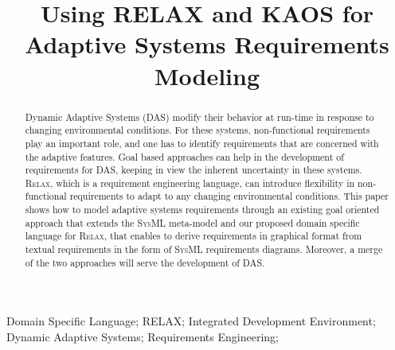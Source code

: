 \documentclass[10pt, conference, compsocconf]{IEEEtran}
\def\myrelax{\textsc{Relax}}                  %
\def\sysml{\textsc{SysML}}
\begin{document}
%
\title{Using RELAX and KAOS for Adaptive Systems Requirements Modeling}



\author{
\and
{}
}


\maketitle

\begin{abstract}
Dynamic Adaptive Systems (DAS) modify their behavior at run-time in response to 
changing environmental conditions. For these systems, non-functional requirements play an 
important role, and one has to identify requirements that are concerned with the adaptive 
features.  Goal based approaches can help in the development of requirements for DAS, keeping in view the inherent uncertainty in these systems. \myrelax{}, which is a requirement engineering language, can introduce flexibility in 
non-functional requirements to adapt to any changing environmental conditions. 
This paper shows how to model adaptive systems requirements through an existing goal 
oriented approach that extends the \sysml{} meta-model and our proposed domain 
specific language for \myrelax{}, that enables to derive requirements in graphical 
format from textual requirements in the form of \sysml{} requirements diagrams. 
Moreover, a merge of the two approaches will serve the development of DAS.
\end{abstract}

\begin{IEEEkeywords}
Domain Specific Language; RELAX; Integrated Development Environment; Dynamic Adaptive Systems; Requirements Engineering;

\end{IEEEkeywords}
\end{document}
